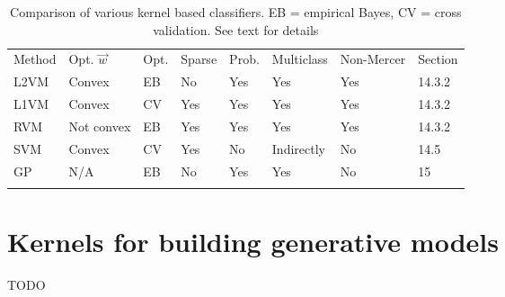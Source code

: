 \begin{table}
\centering
\begin{tabular}{llllllll}
\hline\noalign{\smallskip}
Method & Opt. $\vec{w}$ & Opt. & Sparse & Prob. & Multiclass & Non-Mercer & Section \\
\noalign{\smallskip}\svhline\noalign{\smallskip}
L2VM & Convex & EB & No & Yes & Yes & Yes & 14.3.2 \\
L1VM & Convex & CV & Yes & Yes & Yes & Yes & 14.3.2 \\
RVM & Not convex & EB & Yes & Yes & Yes & Yes & 14.3.2 \\
SVM & Convex & CV & Yes & No & Indirectly & No & 14.5 \\
GP & N/A & EB & No & Yes & Yes & No & 15 \\
\noalign{\smallskip}\hline
\end{tabular}
\caption{Comparison of various kernel based classifiers. EB = empirical Bayes, CV = cross validation. See text for details}\label{tab:Comparison-of-kernel-based-classifiers}
\end{table}


\section{Kernels for building generative models}
TODO
